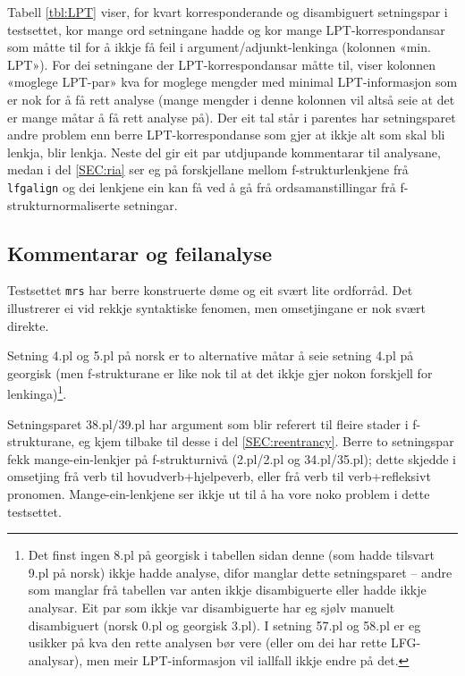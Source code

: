\documentclass[12pt,a4paper,oneside,draft]{report}
\begin{document}
Tabell \ref{tbl:LPT} viser, for kvart korresponderande og disambiguert
setningspar i testsettet, kor mange ord setningane hadde og kor mange
LPT\hyp{}korrespondansar som måtte til for å ikkje få feil i
argument/adjunkt-lenkinga (kolonnen «min. LPT»). For dei setningane
der LPT\hyp{}korrespondansar måtte til, viser kolonnen «moglege LPT-par»
kva for moglege mengder med minimal LPT\hyp{}informasjon som er nok for å
få rett analyse (mange mengder i denne kolonnen vil altså seie at det
er mange måtar å få rett analyse på).  Der eit tal står i parentes har
setningsparet andre problem enn berre LPT\hyp{}korrespondanse som gjer at
ikkje alt som skal bli lenkja, blir lenkja. Neste del gir eit par
utdjupande kommentarar til analysane, medan i del \ref{SEC:ria} ser eg
på forskjellane mellom f\hyp{}strukturlenkjene frå \texttt{lfgalign} og dei
lenkjene ein kan få ved å gå frå ordsamanstillingar frå
f\hyp{}strukturnormaliserte setningar.

\subsection{Kommentarar og feilanalyse}
\label{sec-5.3.1}

\label{SEC:feilanalyse}

Testsettet \texttt{mrs} har berre konstruerte døme og eit svært lite
 ordforråd. Det illustrerer ei vid rekkje syntaktiske fenomen, men
 omsetjingane er nok svært direkte.

Setning 4.pl og 5.pl på norsk er to alternative måtar å seie setning
 4.pl på georgisk (men f\hyp{}strukturane er like nok til at det ikkje gjer
 nokon forskjell for lenkinga)\footnote{Det finst ingen 8.pl på georgisk i tabellen sidan denne (som
        hadde tilsvart 9.pl på norsk) ikkje hadde analyse, difor
        manglar dette setningsparet -- andre som manglar frå tabellen
        var anten ikkje disambiguerte eller hadde ikkje analysar. Eit
        par som ikkje var disambiguerte har eg sjølv manuelt
        disambiguert (norsk 0.pl og georgisk 3.pl). I setning 57.pl og
        58.pl er eg usikker på kva den rette analysen bør vere (eller
        om dei har rette LFG-analysar), men meir LPT\hyp{}informasjon vil
        iallfall ikkje endre på det. }.

Setningsparet 38.pl/39.pl har argument som blir referert til fleire
 stader i f\hyp{}strukturane, eg kjem tilbake til desse i del
 \ref{SEC:reentrancy}. Berre to setningspar fekk mange-ein-lenkjer på
 f\hyp{}strukturnivå (2.pl/2.pl og 34.pl/35.pl); dette skjedde i omsetjing
 frå verb til hovudverb+hjelpeverb, eller frå verb til verb+refleksivt
 pronomen. Mange-ein-lenkjene ser ikkje ut til å ha vore noko problem
 i dette testsettet.
\end{document}
